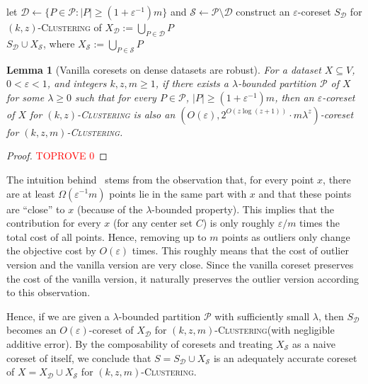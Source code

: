 \documentclass[letterpaper,11pt]{article}
\theoremstyle{plain}
\newtheorem{lemma}[theorem]{Lemma}
\theoremstyle{definition}
\theoremstyle{remark}
\newcommand{\eps}{\varepsilon}
\renewcommand{\epsilon}{\varepsilon}
\newcommand{\calD}{\mathcal{D}}
\newcommand{\calP}{\mathcal{P}}
\newcommand{\calS}{\mathcal{S}}
\newcommand{\ProblemName}[1]{\textsc{#1}}
\newcommand{\kzC}{\ProblemName{$(k,z)$-Clustering}\xspace}
\newcommand{\kzmC}{\ProblemName{$(k,z,m)$-Clustering}\xspace}
\begin{document}
\begin{algorithm}
    \caption{Coreset construction for \kzmC of $X$ based on bounded partition}
    \label{alg:construction based on bounded partition}
    \begin{algorithmic}[1]
        \Require{a $\lambda$-bounded partition $\calP$ of $X$}
        \State let $\calD\gets\{P\in\calP: |P|\ge (1+\eps^{-1})m\}$ and $\calS\gets \calP\setminus\calD$ \label{alg 1 line:decomposition}
        \State construct an $\eps$-coreset $S_{\calD}$ for \kzC of $X_{\calD}:=\bigcup_{P\in\calD} P$ \label{alg 1 line:coreset for dense subset}
        \\
        \Return $S_{\calD}\cup X_{\calS}$, where $X_{\calS}:=\bigcup_{P\in\calS} P$ 
    \end{algorithmic}
\end{algorithm}









\begin{lemma}[Vanilla coresets on dense datasets are robust]
    \label{thm:main1}
For a dataset $X\subseteq V$, $0<\eps<1$, and integers $k,z,m\ge 1$, if there exists a $\lambda$-bounded partition $\calP$ of $X$ for some $\lambda\ge 0$ such that for every $P\in\calP$, $|P|\ge (1+\eps^{-1})m$, then an $\eps$-coreset of $X$ for \kzC
    is also an $\left(O(\eps), 2^{O(z\log(z+1))}\cdot m\lambda^z \right)$-coreset for \kzmC.
\end{lemma}
\begin{proof}\textcolor{red}{TOPROVE 0}\end{proof}
The intuition behind~ stems from the observation that,
for every point $x$, there are at least $\Omega(\epsilon^{-1}m)$ points
lie in the same part with $x$ and that these points are ``close'' to $x$ (because of the $\lambda$-bounded property). This implies that the contribution for every $x$ (for any center set $C$) is only roughly $\epsilon / m$ times the total cost of all points.
Hence, removing up to $m$ points as outliers only change the objective cost 
by $O(\epsilon)$ times.
This roughly means that the cost of outlier version and the vanilla version are very close. Since the vanilla coreset preserves the cost of the vanilla version, it naturally preserves the outlier version according to this observation.

Hence, if we are given a $\lambda$-bounded partition $\calP$ with sufficiently small $\lambda$, then $S_{\calD}$ becomes an $O(\eps)$-coreset of $X_{\calD}$ for \kzmC (with negligible additive error). By the composability of coresets and treating $X_{\calS}$ as a naive coreset of itself, we conclude that $S = S_{\calD}\cup X_{\calS}$ is an adequately accurate coreset of $X = X_{\calD}\cup X_{\calS}$ for \kzmC.
\end{document}
